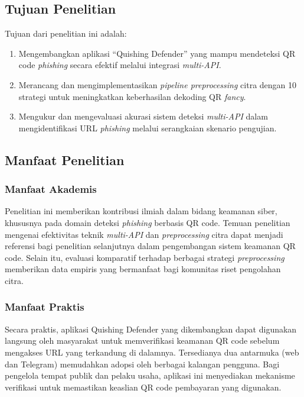 \documentclass[conference]{IEEEtran}
\begin{document}
\subsection{Tujuan Penelitian}

Tujuan dari penelitian ini adalah:

\begin{enumerate}[label=\arabic*)]
    \item Mengembangkan aplikasi ``Quishing Defender'' yang mampu mendeteksi QR code \textit{phishing} secara efektif melalui integrasi \textit{multi-API}.
    \item Merancang dan mengimplementasikan \textit{pipeline preprocessing} citra dengan 10 strategi untuk meningkatkan keberhasilan dekoding QR \textit{fancy}.
    \item Mengukur dan mengevaluasi akurasi sistem deteksi \textit{multi-API} dalam mengidentifikasi URL \textit{phishing} melalui serangkaian skenario pengujian.
\end{enumerate}

\subsection{Manfaat Penelitian}

\subsubsection{Manfaat Akademis}
Penelitian ini memberikan kontribusi ilmiah dalam bidang keamanan siber, khususnya pada domain deteksi \textit{phishing} berbasis QR code. Temuan penelitian mengenai efektivitas teknik \textit{multi-API} dan \textit{preprocessing} citra dapat menjadi referensi bagi penelitian selanjutnya dalam pengembangan sistem keamanan QR code. Selain itu, evaluasi komparatif terhadap berbagai strategi \textit{preprocessing} memberikan data empiris yang bermanfaat bagi komunitas riset pengolahan citra.

\subsubsection{Manfaat Praktis}
Secara praktis, aplikasi Quishing Defender yang dikembangkan dapat digunakan langsung oleh masyarakat untuk memverifikasi keamanan QR code sebelum mengakses URL yang terkandung di dalamnya. Tersedianya dua antarmuka (web dan Telegram) memudahkan adopsi oleh berbagai kalangan pengguna. Bagi pengelola tempat publik dan pelaku usaha, aplikasi ini menyediakan mekanisme verifikasi untuk memastikan keaslian QR code pembayaran yang digunakan.
\end{document}
